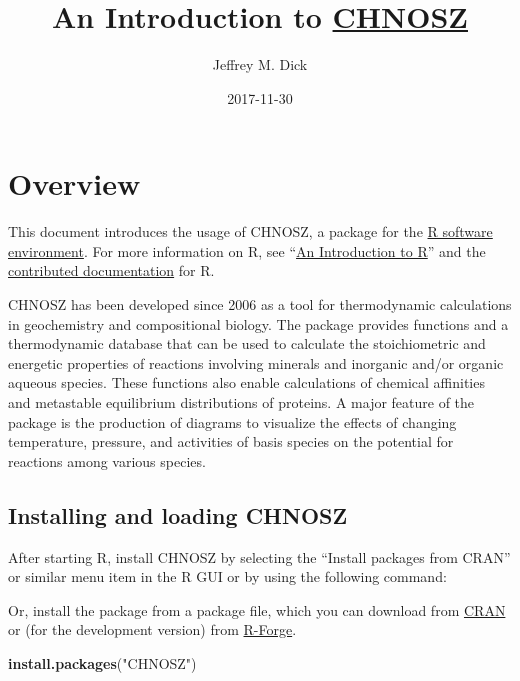 \documentclass[]{tufte-handout}
\title{An Introduction to \href{http://www.chnosz.net}{CHNOSZ}}
\author{Jeffrey M. Dick}
\date{2017-11-30}
\newenvironment{Shaded}{}{}
\newcommand{\KeywordTok}[1]{\textcolor[rgb]{0.00,0.44,0.13}{\textbf{#1}}}
\newcommand{\StringTok}[1]{\textcolor[rgb]{0.25,0.44,0.63}{#1}}
\newcommand{\NormalTok}[1]{#1}
\begin{document}
\maketitle




\section{Overview}\label{overview}

This document introduces the usage of CHNOSZ, a package for the
\href{http://r-project.org}{R software environment}. For more
information on R, see
``\href{https://cran.r-project.org/manuals.html}{An Introduction to R}''
and the \href{https://cran.r-project.org/other-docs.html}{contributed
documentation} for R.

CHNOSZ has been developed since 2006 as a tool for thermodynamic
calculations in geochemistry and compositional biology. The package
provides functions and a thermodynamic database that can be used to
calculate the stoichiometric and energetic properties of reactions
involving minerals and inorganic and/or organic aqueous species. These
functions also enable calculations of chemical affinities and metastable
equilibrium distributions of proteins. A major feature of the package is
the production of diagrams to visualize the effects of changing
temperature, pressure, and activities of basis species on the potential
for reactions among various species.

\subsection{Installing and loading
CHNOSZ}\label{installing-and-loading-chnosz}

After starting R, install CHNOSZ by selecting the ``Install packages
from CRAN'' or similar menu item in the R GUI or by using the following
command:

\begin{marginfigure}
Or, install the package from a package file, which you can download from
\href{https://cran.r-project.org/package=CHNOSZ}{CRAN} or (for the
development version) from
\href{https://r-forge.r-project.org/projects/chnosz/}{R-Forge}.
\end{marginfigure}

\begin{Shaded}
\begin{Highlighting}[]
\KeywordTok{install.packages}\NormalTok{(}\StringTok{"CHNOSZ"}\NormalTok{)}
\end{Highlighting}
\end{Shaded}
\end{document}
